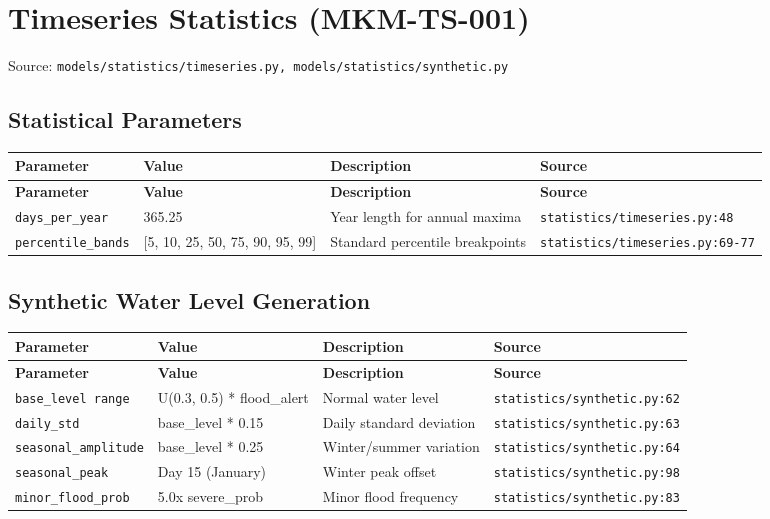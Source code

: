 \documentclass[11pt,a4paper]{article}
\begin{document}
\clearpage

\section{Timeseries Statistics (MKM-TS-001)}

Source: \texttt{models/statistics/timeseries.py, models/statistics/synthetic.py}

\subsection{Statistical Parameters}

\begin{longtable}{p{4cm}p{4cm}p{5.5cm}p{3.5cm}}
    \toprule
    \textbf{Parameter} & \textbf{Value} & \textbf{Description} & \textbf{Source} \\
    \midrule
    \endfirsthead
    \toprule
    \textbf{Parameter} & \textbf{Value} & \textbf{Description} & \textbf{Source} \\
    \midrule
    \endhead
    \bottomrule
    \endfoot
    \texttt{days\_per\_year} & 365.25 & Year length for annual maxima & {\scriptsize \texttt{statistics/timeseries.py:48}} \\
    \texttt{percentile\_bands} & [5, 10, 25, 50, 75, 90, 95, 99] & Standard percentile breakpoints & {\scriptsize \texttt{statistics/timeseries.py:69-77}} \\
\end{longtable}

\subsection{Synthetic Water Level Generation}

\begin{longtable}{p{4cm}p{4cm}p{5.5cm}p{3.5cm}}
    \toprule
    \textbf{Parameter} & \textbf{Value} & \textbf{Description} & \textbf{Source} \\
    \midrule
    \endfirsthead
    \toprule
    \textbf{Parameter} & \textbf{Value} & \textbf{Description} & \textbf{Source} \\
    \midrule
    \endhead
    \bottomrule
    \endfoot
    \texttt{base\_level range} & U(0.3, 0.5) * flood\_alert & Normal water level & {\scriptsize \texttt{statistics/synthetic.py:62}} \\
    \texttt{daily\_std} & base\_level * 0.15 & Daily standard deviation & {\scriptsize \texttt{statistics/synthetic.py:63}} \\
    \texttt{seasonal\_amplitude} & base\_level * 0.25 & Winter/summer variation & {\scriptsize \texttt{statistics/synthetic.py:64}} \\
    \texttt{seasonal\_peak} & Day 15 (January) & Winter peak offset & {\scriptsize \texttt{statistics/synthetic.py:98}} \\
    \texttt{minor\_flood\_prob} & 5.0x severe\_prob & Minor flood frequency & {\scriptsize \texttt{statistics/synthetic.py:83}} \\
\end{longtable}
\end{document}

